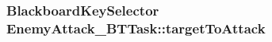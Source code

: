 \subsubsection[{\texorpdfstring{target\+To\+Attack}{targetToAttack}}]{\setlength{\rightskip}{0pt plus 5cm}Blackboard\+Key\+Selector Enemy\+Attack\+\_\+\+B\+T\+Task\+::target\+To\+Attack}\hypertarget{class_enemy_attack___b_t_task_a3e66ecf42db2caaa36b45cc0b6116062}{}\label{class_enemy_attack___b_t_task_a3e66ecf42db2caaa36b45cc0b6116062}
